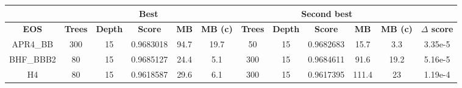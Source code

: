 \begin{table}[]
\centering
\begin{tabular}{@{}cccccccccccc@{}}
\toprule
\multicolumn{1}{l}{}               & \multicolumn{5}{c}{Best}                                                                                                                                                                  & \multicolumn{5}{c}{Second best}                                                                                                                                                           & \multicolumn{1}{l}{}                 \\ \midrule
\multicolumn{1}{|c|}{\textbf{EOS}} & \multicolumn{1}{c|}{\textbf{Trees}} &
    \multicolumn{1}{c|}{\textbf{Depth}} & \multicolumn{1}{c|}{\textbf{Score}} &
    \multicolumn{1}{c|}{\textbf{MB}} & \multicolumn{1}{c|}{\textbf{MB (c)}} &
    \multicolumn{1}{c|}{\textbf{Trees}} & \multicolumn{1}{c|}{\textbf{Depth}} &
    \multicolumn{1}{c|}{\textbf{Score}} & \multicolumn{1}{c|}{\textbf{MB}} &
    \multicolumn{1}{c|}{\textbf{MB (c)}} & \multicolumn{1}{c|}{\textbf{$\Delta$ score}} \\ \midrule
\multicolumn{1}{|c|}{APR4\_BB}     & \multicolumn{1}{c|}{300}            & \multicolumn{1}{c|}{15}             & \multicolumn{1}{c|}{0.9683018}      & \multicolumn{1}{c|}{94.7}        & \multicolumn{1}{c|}{19.7}            & \multicolumn{1}{c|}{50}             & \multicolumn{1}{c|}{15}             & \multicolumn{1}{c|}{0.9682683}      & \multicolumn{1}{c|}{15.7}        & \multicolumn{1}{c|}{3.3}             & \multicolumn{1}{c|}{3.35e-5}         \\ \midrule
\multicolumn{1}{|c|}{BHF\_BBB2}    & \multicolumn{1}{c|}{80}             & \multicolumn{1}{c|}{15}             & \multicolumn{1}{c|}{0.9685127}      & \multicolumn{1}{c|}{24.4}        & \multicolumn{1}{c|}{5.1}             & \multicolumn{1}{c|}{300}            & \multicolumn{1}{c|}{15}             & \multicolumn{1}{c|}{0.9684611}      & \multicolumn{1}{c|}{91.6}        & \multicolumn{1}{c|}{19.2}            & \multicolumn{1}{c|}{5.16e-5}         \\ \midrule
\multicolumn{1}{|c|}{H4}           & \multicolumn{1}{c|}{80}             & \multicolumn{1}{c|}{15}             & \multicolumn{1}{c|}{0.9618587}      & \multicolumn{1}{c|}{29.6}        & \multicolumn{1}{c|}{6.1}             & \multicolumn{1}{c|}{300}            & \multicolumn{1}{c|}{15}             & \multicolumn{1}{c|}{0.9617395}      & \multicolumn{1}{c|}{111.4}       & \multicolumn{1}{c|}{23}              & \multicolumn{1}{c|}{1.19e-4}         \\ \midrule

\end{tabular}
\end{table}

